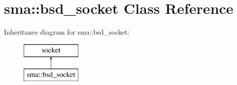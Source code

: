 \hypertarget{classsma_1_1bsd__socket}{\section{sma\-:\-:bsd\-\_\-socket Class Reference}
\label{classsma_1_1bsd__socket}
}
Inheritance diagram for sma\-:\-:bsd\-\_\-socket\-:\begin{figure}[H]
\begin{center}
\leavevmode
\includegraphics[height=2.000000cm]{classsma_1_1bsd__socket}
\end{center}
\end{figure}
